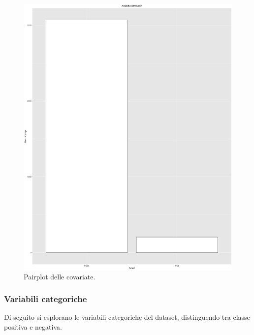\begin{figure}[H]
	\hspace*{-1.5cm}   
	\centering
	\includegraphics[width=23cm, angle=270]{../images/pairplot.png}
	\caption{Pairplot delle covariate.}
	\label{fig:pairplot}
\end{figure}



\subsubsection{Variabili categoriche}
Di seguito si esplorano le variabili categoriche del dataset, distinguendo tra classe positiva e negativa.

